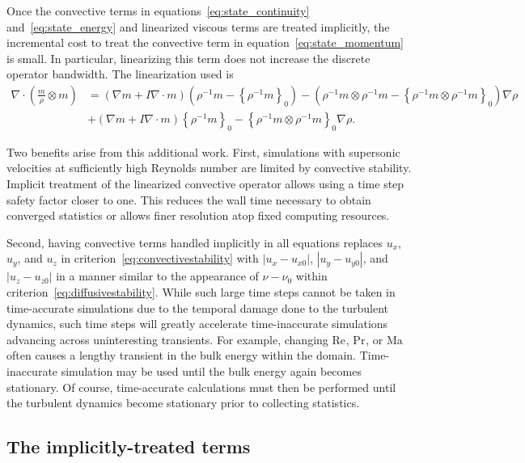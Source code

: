 \documentclass[letterpaper,11pt,nointlimits,reqno,draft]{amsbook}
\newcommand{\Mach}[1][]{\ensuremath{\mbox{Ma}_{#1}}}
\newcommand{\Reynolds}[1][]{\ensuremath{\mbox{Re}_{#1}}}
\newcommand{\Prandtl}[1][]{\ensuremath{\mbox{Pr}_{#1}}}
\newcommand{\reference}[1]{\ensuremath{\left\{#1\right\}_{0}}}
\newcommand{\lessreference}[1]
  {\ensuremath{\left({#1}-\reference{#1}\right)}}
\begin{document}
Once the convective terms in equations~\eqref{eq:state_continuity}
and~\eqref{eq:state_energy} and linearized viscous terms are treated
implicitly, the incremental cost to treat the convective term in
equation~\eqref{eq:state_momentum} is small.  In particular, linearizing this
term does not increase the discrete operator bandwidth.  The linearization used
is
\begin{align}
  \nabla\cdot\left(\frac{m}{\rho}\otimes{}m\right)
&=
    \left(\nabla{}m + I \nabla\cdot{}m\right)\lessreference{\rho^{-1}m}
  - \lessreference{\rho^{-1}m\otimes\rho^{-1}m}\nabla\rho
\\
 &+ \left(\nabla{}m + I \nabla\cdot{}m\right)\reference{\rho^{-1}m}
  - \reference{\rho^{-1}m\otimes\rho^{-1}m}\nabla\rho
  .
\end{align}

Two benefits arise from this additional work.  First, simulations with
supersonic velocities at sufficiently high Reynolds number are limited by
convective stability.  Implicit treatment of the linearized convective operator
allows using a time step safety factor closer to one.  This reduces the wall
time necessary to obtain converged statistics or allows finer resolution atop
fixed computing resources.

Second, having convective terms handled implicitly in all equations replaces
$u_x$, $u_y$, and $u_z$ in criterion~\eqref{eq:convectivestability} with
$\left|u_x-u_{x0}\right|$, $\left|u_y-u_{y0}\right|$, and
$\left|u_z-u_{z0}\right|$ in a manner similar to the appearance of $\nu-\nu_0$
within criterion~\eqref{eq:diffusivestability}.  While such large time steps
cannot be taken in time-accurate simulations due to the temporal damage done to
the turbulent dynamics, such time steps will greatly accelerate time-inaccurate
simulations advancing across uninteresting transients.  For example, changing
$\Reynolds$, $\Prandtl$, or $\Mach$ often causes a lengthy transient in the
bulk energy within the domain.  Time-inaccurate simulation may be used until
the bulk energy again becomes stationary.  Of course, time-accurate
calculations must then be performed until the turbulent dynamics become
stationary prior to collecting statistics.

\subsection{The implicitly-treated terms}
\label{sec:implicitlytreatedterms}
\end{document}
